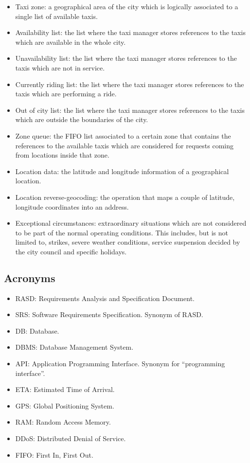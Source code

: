 \begin{itemize}
\item Taxi zone: a geographical area of the city which is logically associated to a single list of available taxis. 
\item Availability list: the list where the taxi manager stores references to the taxis which are available in the whole city.
\item Unavailability list: the list where the taxi manager stores references to the taxis which are not in service.
\item Currently riding list: the list where the taxi manager stores references to the taxis which are performing a ride.
\item Out of city list: the list where the taxi manager stores references to the taxis which are outside the boundaries of the city. 
\item Zone queue: the FIFO list associated to a certain zone that contains the references to the available taxis which are considered for requests coming from locations inside that zone. 
\item Location data: the latitude and longitude information of a geographical location.
\item Location reverse-geocoding: the operation that maps a couple of latitude, longitude coordinates into an address. 
\item Exceptional circumstances: extraordinary situations which are not considered to be part of the normal operating conditions. This includes, but is not limited to, strikes, severe weather conditions, service suspension decided by the city council and specific holidays.
\end{itemize}


\subsection{Acronyms}
\begin{itemize}
\item RASD: Requirements Analysis and Specification Document.
\item SRS: Software Requirements Specification. Synonym of RASD.
\item DB: Database.
\item DBMS: Database Management System.
\item API: Application Programming Interface. Synonym for ``programming interface''.
\item ETA: Estimated Time of Arrival.
\item GPS: Global Positioning System.
\item RAM: Random Access Memory.
\item DDoS: Distributed Denial of Service.
\item FIFO: First In, First Out.
\end{itemize}


